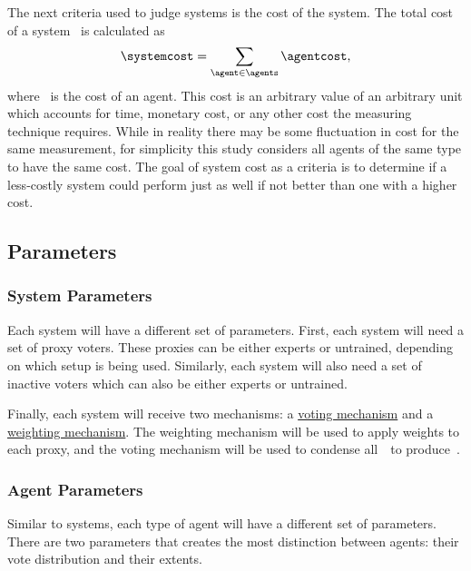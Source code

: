 The next criteria used to judge systems is the cost of the system.
The total cost of a system \systemcost\ is calculated as
\begin{equation}
    \systemcost =
    \sum_{\agent \in \agents}{
        \agentcost
    }
    \text{,}\label{eq:cost}
\end{equation}
where \agentcost\ is the cost of an agent.
This cost is an arbitrary value of an arbitrary unit which accounts for time,
monetary cost, or any other cost the measuring technique requires.
While in reality there may be some fluctuation in cost for the same
measurement, for simplicity this study considers all agents of the same type
to have the same cost.
The goal of system cost as a criteria is to determine if a less-costly system
could perform just as well if not better than one with a higher cost.


\subsection{Parameters}\label{subsec:parameters}

\subsubsection{System Parameters}\label{subsubsec:system-parameters}
Each system will have a different set of parameters.
First, each system will need a set of proxy voters.
These proxies can be either experts or untrained, depending on which setup is
being used.
Similarly, each system will also need a set of inactive voters which can also
be either experts or untrained.

Finally, each system will receive two mechanisms: a
\hyperref[subsec:voting-mechanisms]{voting mechanism} and a
\hyperref[subsec:weighting-mechanisms]{weighting mechanism}.
The weighting mechanism will be used to apply weights to each proxy, and the
voting mechanism will be used to condense all~\agenttruth\ to
produce~\systemtruth.

\subsubsection{Agent Parameters}\label{subsubsec:agent-parameters}
Similar to systems, each type of agent will have a different set of parameters.
There are two parameters that creates the most distinction between
agents: their vote distribution and their extents.

